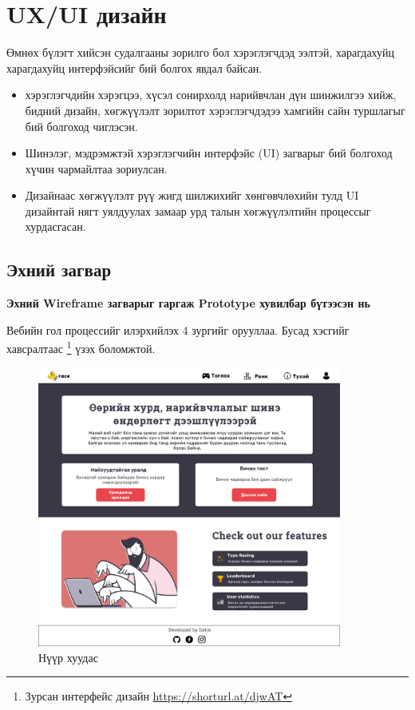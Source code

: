 \pagebreak
\section{UX/UI дизайн}

Өмнөх бүлэгт хийсэн судалгааны зорилго бол хэрэглэгчдэд ээлтэй, харагдахуйц харагдахуйц интерфэйсийг бий болгох явдал байсан.

\begin{itemize}
	\item хэрэглэгчдийн хэрэгцээ, хүсэл сонирхолд нарийвчлан дүн шинжилгээ хийж, бидний дизайн, хөгжүүлэлт зорилтот хэрэглэгчдэдээ хамгийн сайн туршлагыг бий болгоход чиглэсэн.
	\item Шинэлэг, мэдрэмжтэй хэрэглэгчийн интерфэйс (UI) загварыг бий болгоход хүчин чармайлтаа зориулсан.
	\item Дизайнаас хөгжүүлэлт рүү жигд шилжихийг хөнгөвчлөхийн тулд UI дизайнтай нягт уялдуулах замаар урд талын хөгжүүлэлтийн процессыг хурдасгасан.
\end{itemize}

\subsection{Эхний загвар}

\textbf{Эхний Wireframe загварыг гаргаж Prototype хувилбар бүтээсэн нь}

Вебийн гол процессийг илэрхийлэх 4 зургийг орууллаа. Бусад хэсгийг хавсралтаас \footnote{Зурсан интерфейс дизайн \url{https://shorturl.at/djwAT}} үзэх боломжтой.

\begin{figure}[h]
	\centering
	\includegraphics[width=10cm]{images/interfaces/ver1/mainpage.png}
	\caption{Нүүр хуудас}
	\label{fig:interface-v1-01}
\end{figure}

